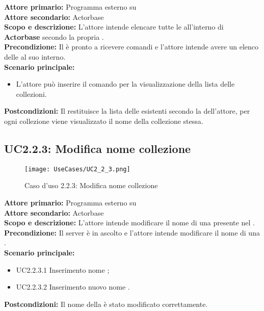 \documentclass{scalatekids-article}
\begin{document}
\textbf{Attore primario:} Programma esterno su \\
\textbf{Attore secondario:} Actorbase\\
\textbf{Scopo e descrizione:} L'attore intende elencare tutte le  all'interno di \textbf{Actorbase} secondo la propria .\\
\textbf{Precondizione:} Il  è pronto a ricevere comandi e l'attore intende avere un elenco delle  al suo interno.\\
\textbf{Scenario principale:}
\begin{itemize}
\item L'attore può inserire il comando per la visualizzazione della lista delle collezioni.
\end{itemize}
\textbf{Postcondizioni:} Il  restituisce la lista delle  esistenti secondo la  dell'attore, per ogni collezione viene visualizzato il nome della collezione stessa.

\subsection{UC2.2.3: Modifica nome collezione}

\begin{figure}[H]
  \begin{center}
    \texttt{[image: UseCases/UC2\_2\_3.png]}
    \caption*{Caso d'uso 2.2.3: Modifica nome collezione}
  \end{center}
\end{figure}
\textbf{Attore primario:} Programma esterno su \\
\textbf{Attore secondario:} Actorbase\\
\textbf{Scopo e descrizione:} L'attore intende modificare il nome di una  presente nel .\\
\textbf{Precondizione:} Il server è in ascolto e l’attore intende modificare il nome di una .\\
\textbf{Scenario principale:}
\begin{itemize}
\item UC2.2.3.1 Inserimento nome ;
\item UC2.2.3.2 Inserimento nuovo nome .
\end{itemize}
\textbf{Postcondizioni:} Il nome della  è stato modificato correttamente.
\end{document}
